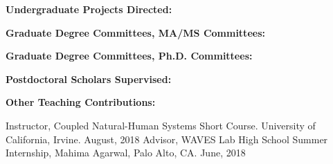 \documentclass[10pt]{article}
\begin{document}
\vspace{1cm}
{\bf Undergraduate Projects Directed:}

\newpage
\vspace{1cm}
{\bf Graduate Degree Committees, MA/MS Committees:}
\vspace{0.25cm}



\vspace{0.5cm}
{\bf Graduate Degree Committees, Ph.D. Committees:}
\vspace{0.25cm}



\vspace{0.5cm}
{\bf Postdoctoral Scholars Supervised:}


\vspace{0.5cm}
{\bf Other Teaching Contributions:}
\vspace{0.25cm}

Instructor, Coupled Natural-Human Systems Short Course. University of California, Irvine. August, 2018
Advisor, WAVES Lab High School Summer Internship, Mahima Agarwal, Palo Alto, CA. June, 2018
 
\end{document}
